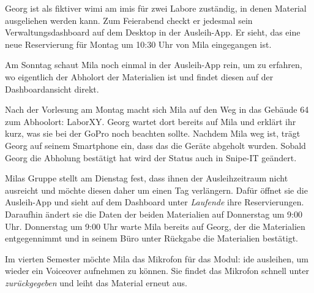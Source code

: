 Georg ist als fiktiver \ac{wimi} am \ac{imis} für zwei Labore zuständig, in denen Material
ausgeliehen werden kann. Zum Feierabend checkt er jedesmal sein Verwaltungsdashboard auf dem Desktop
in der Ausleih-App. Er sieht, das eine neue Reservierung für Montag um 10:30 Uhr von Mila
eingegangen ist. 

Am Sonntag schaut Mila noch einmal in der Ausleih-App rein, um zu erfahren, wo eigentlich der
Abholort der Materialien ist und findet diesen auf der Dashboardansicht direkt.

Nach der Vorlesung am Montag macht sich Mila auf den Weg in das Gebäude 64 zum Abhoolort: LaborXY.
Georg wartet dort bereits auf Mila und erklärt ihr kurz, was sie bei der GoPro noch beachten sollte. 
Nachdem Mila weg ist, trägt Georg auf seinem Smartphone ein, dass das die Geräte abgeholt wurden.
Sobald Georg die Abholung bestätigt hat wird der Status auch in Snipe-IT geändert.

Milas Gruppe stellt am Dienstag fest, dass ihnen der Ausleihzeitraum nicht ausreicht und möchte
diesen daher um einen Tag verlängern. Dafür öffnet sie die Ausleih-App und sieht auf dem Dashboard
unter \textit{Laufende} ihre Reservierungen. Daraufhin ändert sie die Daten der beiden Materialien
auf Donnerstag um 9:00 Uhr. Donnerstag um 9:00 Uhr warte Mila bereits auf Georg, der die Materialien
entgegennimmt und in seinem Büro unter Rückgabe die Materialien bestätigt.

Im vierten Semester möchte Mila das Mikrofon für das Modul: \ac{ide} ausleihen, um wieder
ein Voiceover aufnehmen zu können. Sie findet das Mikrofon schnell unter \textit{zurückgegeben} und
leiht das Material erneut aus.